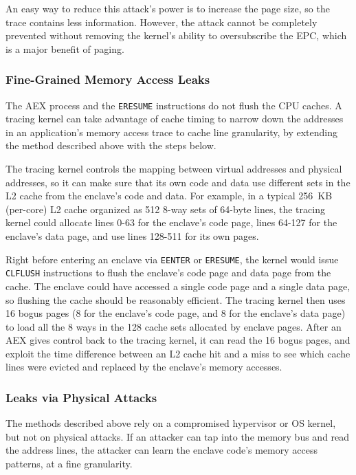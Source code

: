 An easy way to reduce this attack's power is to increase the page size, so the
trace contains less information. However, the attack cannot be completely
prevented without removing the kernel's ability to oversubscribe the EPC,
which is a major benefit of paging.

\subsubsection{Fine-Grained Memory Access Leaks}

The AEX process and the \texttt{ERESUME} instructions do not flush the CPU
caches. A tracing kernel can take advantage of cache timing to narrow down
the addresses in an application's memory access trace to cache line
granularity, by extending the method described above with the steps below.

The tracing kernel controls the mapping between virtual addresses and physical
addresses, so it can make sure that its own code and data use different sets
in the L2 cache from the enclave's code and data. For example, in a typical
256~KB (per-core) L2 cache organized as 512 8-way sets of 64-byte lines, the
tracing kernel could allocate lines 0-63 for the enclave's code page, lines
64-127 for the enclave's data page, and use lines 128-511 for its own pages.

Right before entering an enclave via \texttt{EENTER} or \texttt{ERESUME}, the
kernel would issue \texttt{CLFLUSH} instructions to flush the enclave's code
page and data page from the cache. The enclave could have accessed a single
code page and a single data page, so flushing the cache should be reasonably
efficient. The tracing kernel then uses 16 bogus pages (8 for the enclave's
code page, and 8 for the enclave's data page) to load all the 8 ways in the 128
cache sets allocated by enclave pages. After an AEX gives control back to the
tracing kernel, it can read the 16 bogus pages, and exploit the time difference
between an L2 cache hit and a miss to see which cache lines were evicted and
replaced by the enclave's memory accesses.

\subsubsection{Leaks via Physical Attacks}

The methods described above rely on a compromised hypervisor or OS kernel, but
not on physical attacks. If an attacker can tap into the memory bus and read
the address lines, the attacker can learn the enclave code's memory access
patterns, at a fine granularity.

